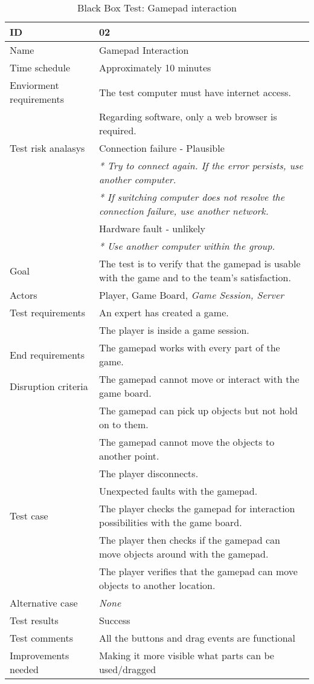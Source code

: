 {\footnotesize
\begin{table}[H]
\begin{tabular}{| p{5cm} | p{10cm} |}\hline
	\textbf{ID}	& \textbf{02}\\ \hline
	Name		& Gamepad Interaction\\ \hline
	Time schedule	& Approximately 10 minutes\\ \hline
	Enviorment requirements 
		& The test computer must have internet access. \\
		& Regarding software, only a web browser is required. \\ \hline
	Test risk analasys 
		& Connection failure - Plausible \\
		& \emph{* Try to connect again. If the error persists, use another computer.} \\
		& \emph{* If switching computer does not resolve the connection failure, use another network.}\\ 
		& Hardware fault - unlikely \\
		& \emph{* Use another computer within the group.} \\ \hline
	Goal	& The test is to verify that the gamepad is usable with the game and to the team’s satisfaction. \\ \hline
	Actors	& Player, Game Board, \emph{Game Session, Server}\\ \hline
	Test requirements
		& An expert has created a game. \\
		& The player is inside a game session. \\ \hline
	End requirements 
		& The gamepad works with every part of the game.\\ \hline
	Disruption criteria 
		& The gamepad cannot move or interact with the game board. \\
		& The gamepad can pick up objects but not hold on to them. \\
		& The gamepad cannot move the objects to another point. \\
		& The player disconnects. \\ 
		& Unexpected faults with the gamepad. \\ \hline
	Test case
		& The player checks the gamepad for interaction possibilities with the game board. \\
		& The player then checks if the gamepad can move objects around with the gamepad. \\
		& The player verifies that the gamepad can move objects to another location. \\ \hline
	Alternative case
		& \emph{None}\\ \hline
	Test results 
		& Success\\ \hline
	Test comments
		& All the buttons and drag events are functional\\ \hline
	Improvements needed
		& Making it more visible what parts can be used/dragged \\ \hline
\end{tabular}


\caption{Black Box Test: Gamepad interaction}
\label{fig:black_box_test_2}
\end{table}}

